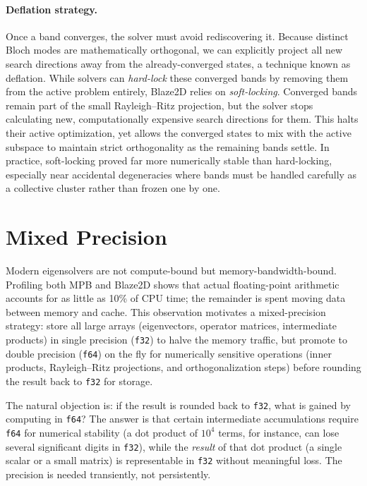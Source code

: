 \paragraph{Deflation strategy.}
Once a band converges, the solver must avoid rediscovering it. Because
distinct Bloch modes are mathematically orthogonal, we can explicitly
project all new search directions away from the already-converged
states, a technique known as deflation. While solvers can
\emph{hard-lock} these converged bands by removing them from the active
problem entirely, Blaze2D relies on \emph{soft-locking}. Converged
bands remain part of the small Rayleigh--Ritz projection, but the
solver stops calculating new, computationally expensive search
directions for them. This halts their active optimization, yet allows
the converged states to mix with the active subspace to maintain
strict orthogonality as the remaining bands settle. In practice,
soft-locking proved far more numerically stable than hard-locking,
especially near accidental degeneracies where bands must be handled
carefully as a collective cluster rather than frozen one by one.

\section{Mixed Precision}\label{sec:mixed_precision}

Modern eigensolvers are not compute-bound but memory-bandwidth-bound.
Profiling both MPB and Blaze2D shows that actual floating-point
arithmetic accounts for as little as 10\% of CPU time; the remainder
is spent moving data between memory and cache. This observation
motivates a mixed-precision strategy: store all large arrays
(eigenvectors, operator matrices, intermediate products) in single
precision (\texttt{f32}) to halve the memory traffic, but promote to
double precision (\texttt{f64}) on the fly for numerically sensitive
operations (inner products, Rayleigh--Ritz projections, and
orthogonalization steps) before rounding the result back to
\texttt{f32} for storage.

The natural objection is: if the result is rounded back to \texttt{f32},
what is gained by computing in \texttt{f64}? The answer is that certain
intermediate accumulations require \texttt{f64} for numerical stability
(a dot product of $10^{4}$ terms, for instance, can lose several
significant digits in \texttt{f32}), while the \emph{result} of that
dot product (a single scalar or a small matrix) is representable in
\texttt{f32} without meaningful loss. The precision is needed
transiently, not persistently.

